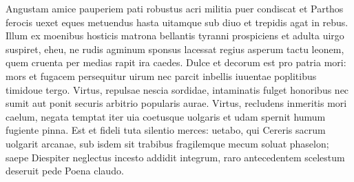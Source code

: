 \documentclass{book}
\newenvironment {carmen} [1] [\relax] 
  {\Titulus \Versus \incipit*\numerus{1}#1}
  {\endVersus}
\newcommand {\Alcaic}    {\Forma \strophae {0 \poena 01 \poena 2}}
\begin{document}
\begin{carmen}[\Alcaic]


Angustam amice pauperiem pati
 robustus acri militia puer
      condiscat et Parthos ferocis
      uexet eques metuendus hasta 
uitamque sub diuo et trepidis agat               
 in rebus. Illum ex moenibus hosticis
      matrona bellantis tyranni
      prospiciens et adulta uirgo 
suspiret, eheu, ne rudis agminum
 sponsus lacessat regius asperum               
      tactu leonem, quem cruenta
      per medias rapit ira caedes. 
Dulce et decorum est pro patria mori:
 mors et fugacem persequitur uirum
      nec parcit inbellis iuuentae
      poplitibus timidoue tergo.                
Virtus, repulsae nescia sordidae,
 intaminatis fulget honoribus
      nec sumit aut ponit securis
      arbitrio popularis aurae.                
Virtus, recludens inmeritis mori
 caelum, negata temptat iter uia
      coetusque uolgaris et udam
      spernit humum fugiente pinna. 
Est et fideli tuta silentio               
 merces: uetabo, qui Cereris sacrum
      uolgarit arcanae, sub isdem
      sit trabibus fragilemque mecum 
soluat phaselon; saepe Diespiter
 neglectus incesto addidit integrum,               
      raro antecedentem scelestum
      deseruit pede Poena claudo. 

\end{carmen}
\end{document}
